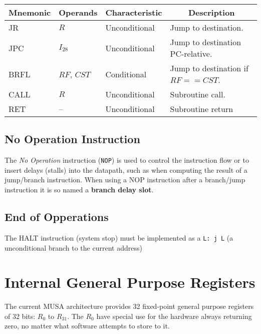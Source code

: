 \documentclass{article}
\begin{document}
  \FloatBarrier
    \begin{table}[H]
      \begin{center}
		\begin{tabular}[pos]{| l | l | l | l |} \hline 	
	\multicolumn{1}{|c|}{\cellcolor[gray]{0.9}\textbf{Mnemonic}} &
	\multicolumn{1}{c|}{\cellcolor[gray]{0.9}\textbf{Operands}} &
	\multicolumn{1}{c|}{\cellcolor[gray]{0.9}\textbf{Characteristic}} &
	\multicolumn{1}{c|}{\cellcolor[gray]{0.9}\textbf{Description}} 			\\ \hline
	  JR  	& $R$ 		& Unconditional & Jump to destination. 			\\ \hline
	  JPC 	& $I_{28}$ 	& Unconditional & Jump to destination PC-relative. 	\\ \hline
	  BRFL 	& $RF$, $CST$ 	& Conditional 	& Jump to destination if $RF == CST$.\\ \hline
	  CALL   	& $R$		& Unconditional & Subroutine call.	\\ \hline
	  RET  	& -- 		& Unconditional & Subroutine return 			\\ \hline
	\end{tabular}
      \end{center}
    \end{table} 
  
  \subsection{No Operation Instruction}
  The \textit{No Operation} instruction (\texttt{NOP}) is used to control the instruction flow or to insert delays (stalls) into the datapath, such as when computing the result of a jump/branch instruction. When using a NOP instruction after a branch/jump instruction it is so named a \textbf{branch delay slot}.
  
  \subsection{End of Opperations}
  The HALT instruction (system stop) must be implemented as a \texttt{L: j L} (a unconditional branch to the current address)
  
  \section{Internal General Purpose Registers}
  \label{sec:register}
  The current MUSA architecture provides 32 fixed-point general purpose registers of 32 bits: $R_0$ to $R_{31}$. The $R_0$ have special use for the hardware always returning zero, no matter what software attempts to store to it.
\end{document}
